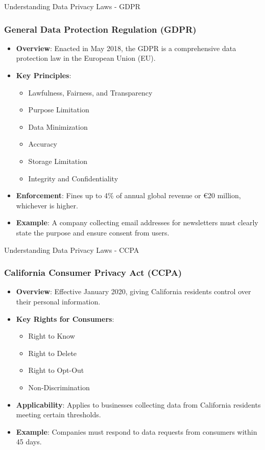 \documentclass[aspectratio=169]{beamer}
\begin{document}
\begin{frame}[fragile]{Understanding Data Privacy Laws - GDPR}
  \frametitle{General Data Protection Regulation (GDPR)}
  
  \begin{itemize}
    \item \textbf{Overview}: Enacted in May 2018, the GDPR is a comprehensive data protection law in the European Union (EU).
    \item \textbf{Key Principles}:
      \begin{itemize}
        \item Lawfulness, Fairness, and Transparency
        \item Purpose Limitation
        \item Data Minimization
        \item Accuracy
        \item Storage Limitation
        \item Integrity and Confidentiality
      \end{itemize}
    \item \textbf{Enforcement}: Fines up to 4\% of annual global revenue or €20 million, whichever is higher.
    \item \textbf{Example}: A company collecting email addresses for newsletters must clearly state the purpose and ensure consent from users.
  \end{itemize}
\end{frame}

\begin{frame}[fragile]{Understanding Data Privacy Laws - CCPA}
  \frametitle{California Consumer Privacy Act (CCPA)}
  
  \begin{itemize}
    \item \textbf{Overview}: Effective January 2020, giving California residents control over their personal information.
    \item \textbf{Key Rights for Consumers}:
      \begin{itemize}
        \item Right to Know
        \item Right to Delete
        \item Right to Opt-Out
        \item Non-Discrimination
      \end{itemize}
    \item \textbf{Applicability}: Applies to businesses collecting data from California residents meeting certain thresholds.
    \item \textbf{Example}: Companies must respond to data requests from consumers within 45 days.
  \end{itemize}
\end{frame}
\end{document}
